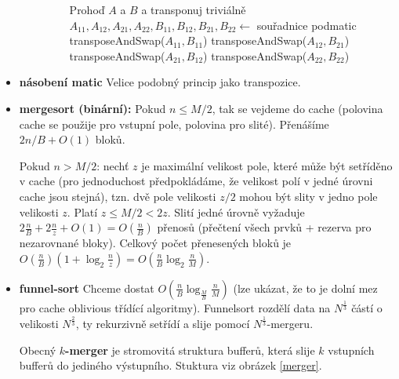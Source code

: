 \documentclass[11pt]{report} %
\numberwithin{equation}{section}
\begin{document}
\begin{itemize}
\begin{enumerate}
\begin{figure}[h]
\begin{minipage}{.7\linewidth}
\begin{algorithm}[H]
\begin{algorithmic}[1]
									\State Prohoď $A$ a $B$ a transponuj triviálně
								\Else
									\State $A_{11}, A_{12}, A_{21}, A_{22}, B_{11}, B_{12}, B_{21}, B_{22} \gets$ souřadnice podmatic
									\State transposeAndSwap($A_{11}, B_{11}$)
									\State transposeAndSwap($A_{12}, B_{21}$)
									\State transposeAndSwap($A_{21}, B_{12}$)
									\State transposeAndSwap($A_{22}, B_{22}$)
								\EndIf
								
							\EndFunction
						\end{algorithmic}
					\end{algorithm}				
				\end{minipage}
			\end{figure}
		\end{enumerate}
		\item \textbf{násobení matic} Velice podobný princip jako transpozice.
		\item \textbf{mergesort (binární):} Pokud $n \leq M/2$, tak se vejdeme do cache (polovina cache se použije pro vstupní pole, polovina pro slité). Přenášíme $2n/B + O(1)$ bloků.
		
		Pokud $n > M/2$: nechť $z$ je maximální velikost pole, které může být setříděno v cache (pro jednoduchost předpokládáme, že velikost polí v jedné úrovni cache jsou stejná), tzn. dvě pole velikosti $z/2$ mohou být slity v jedno pole velikosti $z$. Platí $z \leq M/2 < 2z$. Slití jedné úrovně vyžaduje $2\frac{n}{B} + 2\frac{n}{z} + O(1) = O(\frac{n}{B})$ přenosů (přečtení všech prvků + rezerva pro nezarovnané bloky). Celkový počet přenesených bloků je $O(\frac{n}{B})(1+\log_2\frac{n}{z}) = O(\frac{n}{B}\log_2\frac{n}{M})$.
		
		\item \textbf{funnel-sort} Chceme dostat $O(\frac{n}{B}\log_{\frac{M}{B}}\frac{n}{M})$ (lze ukázat, že to je dolní mez pro cache oblivious třídící algoritmy). Funnelsort rozdělí data na $N^{\frac{1}{3}}$ částí o velikosti $N^{\frac{2}{3}}$, ty rekurzivně setřídí a slije pomocí $N^{\frac{1}{3}}$-mergeru. 
		
		Obecný \textbf{$k$-merger} je stromovitá struktura bufferů, která slije $k$ vstupních bufferů do jediného výstupního. Stuktura viz obrázek \ref{merger}.
		

\end{itemize}
\end{document}
